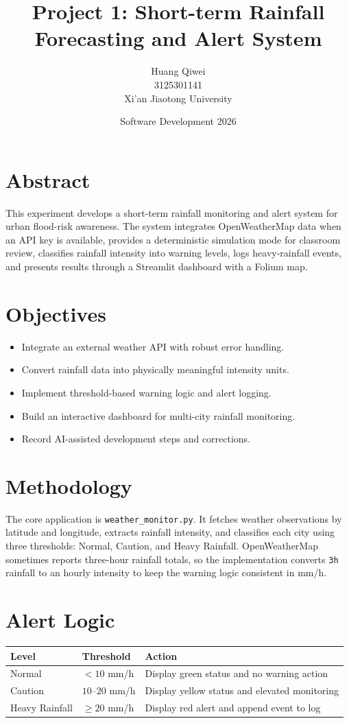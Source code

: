 \documentclass[11pt]{article}
\title{Project 1: Short-term Rainfall Forecasting and Alert System}
\author{Huang Qiwei \\ 3125301141 \\ Xi'an Jiaotong University}
\date{Software Development 2026}
\begin{document}
\maketitle

\section*{Abstract}
This experiment develops a short-term rainfall monitoring and alert system for urban flood-risk awareness. The system integrates OpenWeatherMap data when an API key is available, provides a deterministic simulation mode for classroom review, classifies rainfall intensity into warning levels, logs heavy-rainfall events, and presents results through a Streamlit dashboard with a Folium map.

\section*{Objectives}
\begin{itemize}
  \item Integrate an external weather API with robust error handling.
  \item Convert rainfall data into physically meaningful intensity units.
  \item Implement threshold-based warning logic and alert logging.
  \item Build an interactive dashboard for multi-city rainfall monitoring.
  \item Record AI-assisted development steps and corrections.
\end{itemize}

\section*{Methodology}
The core application is \texttt{weather\_monitor.py}. It fetches weather observations by latitude and longitude, extracts rainfall intensity, and classifies each city using three thresholds: Normal, Caution, and Heavy Rainfall. OpenWeatherMap sometimes reports three-hour rainfall totals, so the implementation converts \texttt{3h} rainfall to an hourly intensity to keep the warning logic consistent in mm/h.

\section*{Alert Logic}
\begin{longtable}{lll}
\toprule
Level & Threshold & Action \\
\midrule
Normal & $<10$ mm/h & Display green status and no warning action \\
Caution & $10$--$20$ mm/h & Display yellow status and elevated monitoring \\
Heavy Rainfall & $\geq 20$ mm/h & Display red alert and append event to log \\
\bottomrule
\end{longtable}
\end{document}
